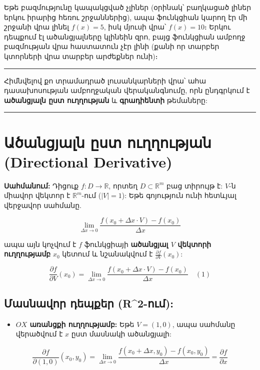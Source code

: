 \documentclass[12pt, a4paper]{article}
\begin{document}
Եթե բազմությունը կապակցված չլիներ (օրինակ՝ բաղկացած լիներ երկու իրարից հեռու շրջաններից), ապա ֆունկցիան կարող էր մի շրջանի վրա լինել $f(x)=5$, իսկ մյուսի վրա՝ $f(x)=10$։ Երկու դեպքում էլ ածանցյալները կլինեին զրո, բայց ֆունկցիան ամբողջ բազմության վրա հաստատուն չէր լինի (քանի որ տարբեր կտորների վրա տարբեր արժեքներ ունի)։

\vspace{1em}
\hrule
\vspace{1em}

Հիմնվելով քո տրամադրած լուսանկարների վրա՝ ահա դասախոսության ամբողջական վերականգնումը, որն ընդգրկում է \textbf{ածանցյալն ըստ ուղղության} և \textbf{գրադիենտի} թեմաները:

\vspace{1em}
\hrule
\vspace{1em}

\section{Ածանցյալն ըստ ուղղության (Directional Derivative)}

\textbf{Սահմանում:} Դիցուք $f: D \to \mathbb{R}$, որտեղ $D \subset \mathbb{R}^m$ բաց տիրույթ է: $V$-ն միավոր վեկտոր է $\mathbb{R}^m$-ում ($|V|=1$):
Եթե գոյություն ունի հետևյալ վերջավոր սահմանը.

$$\lim_{\Delta x \to 0} \frac{f(x_0 + \Delta x \cdot V) - f(x_0)}{\Delta x}$$

ապա այն կոչվում է $f$ ֆունկցիայի \textbf{ածանցյալ $V$ վեկտորի ուղղությամբ} $x_0$ կետում և նշանակվում է $\frac{\partial f}{\partial V}(x_0)$:

$$\frac{\partial f}{\partial V}(x_0) = \lim_{\Delta x \to 0} \frac{f(x_0 + \Delta x \cdot V) - f(x_0)}{\Delta x} \quad (1) \text{}$$

\subsection{Մասնավոր դեպքեր (R\textasciicircum 2-ում):}

\begin{itemize}
    \item \textbf{$OX$ առանցքի ուղղությամբ:} Եթե $V = (1, 0)$, ապա սահմանը վերածվում է $x$ ըստ մասնակի ածանցյալի:
\end{itemize}

$$\frac{\partial f}{\partial (1,0)}(x_0, y_0) = \lim_{\Delta x \to 0} \frac{f(x_0 + \Delta x, y_0) - f(x_0, y_0)}{\Delta x} = \frac{\partial f}{\partial x} \text{}$$
\end{document}
